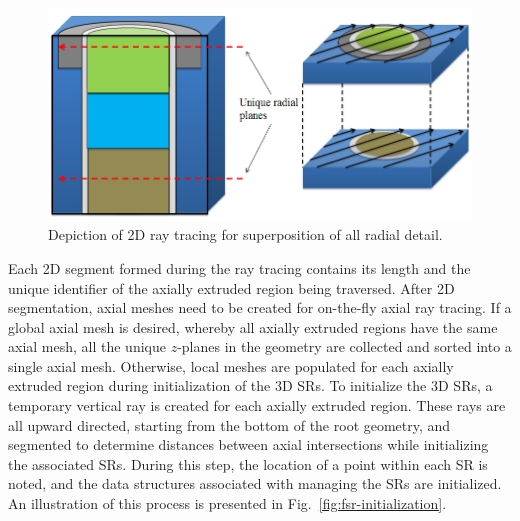\begin{figure}[ht!]
	\centering
	\includegraphics[width=\linewidth]{figures/ph2016/new_unique_z_levels_v_extruded_rt2.png}
	\caption{Depiction of 2D ray tracing for superposition of all radial detail.}
	\label{fig:superposition}
\end{figure}

Each 2D segment formed during the ray tracing contains its length and the unique identifier of the axially extruded region being traversed. After 2D segmentation, axial meshes need to be created for on-the-fly axial ray tracing. If a global axial mesh is desired, whereby all axially extruded regions have the same axial mesh, all the unique $z$-planes in the geometry are collected and sorted into a single axial mesh. Otherwise, local meshes are populated for each axially extruded region during initialization of the 3D \ac{SR}s. To initialize the 3D \ac{SR}s, a temporary vertical ray is created for each axially extruded region. These rays are all upward directed, starting from the bottom of the root geometry, and segmented to determine distances between axial intersections while initializing the associated \ac{SR}s. During this step, the location of a point within each \ac{SR} is noted, and the data structures associated with managing the \ac{SR}s are initialized. An illustration of this process is presented in Fig.~\ref{fig:fsr-initialization}.

